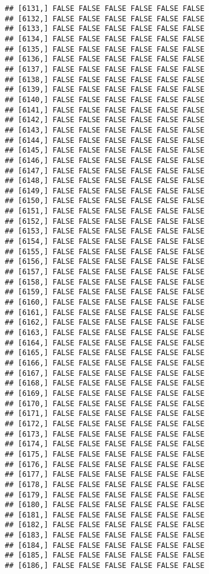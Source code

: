 \documentclass[
]{article}
\begin{document}
\begin{verbatim}
## [6131,] FALSE FALSE FALSE FALSE FALSE FALSE
## [6132,] FALSE FALSE FALSE FALSE FALSE FALSE
## [6133,] FALSE FALSE FALSE FALSE FALSE FALSE
## [6134,] FALSE FALSE FALSE FALSE FALSE FALSE
## [6135,] FALSE FALSE FALSE FALSE FALSE FALSE
## [6136,] FALSE FALSE FALSE FALSE FALSE FALSE
## [6137,] FALSE FALSE FALSE FALSE FALSE FALSE
## [6138,] FALSE FALSE FALSE FALSE FALSE FALSE
## [6139,] FALSE FALSE FALSE FALSE FALSE FALSE
## [6140,] FALSE FALSE FALSE FALSE FALSE FALSE
## [6141,] FALSE FALSE FALSE FALSE FALSE FALSE
## [6142,] FALSE FALSE FALSE FALSE FALSE FALSE
## [6143,] FALSE FALSE FALSE FALSE FALSE FALSE
## [6144,] FALSE FALSE FALSE FALSE FALSE FALSE
## [6145,] FALSE FALSE FALSE FALSE FALSE FALSE
## [6146,] FALSE FALSE FALSE FALSE FALSE FALSE
## [6147,] FALSE FALSE FALSE FALSE FALSE FALSE
## [6148,] FALSE FALSE FALSE FALSE FALSE FALSE
## [6149,] FALSE FALSE FALSE FALSE FALSE FALSE
## [6150,] FALSE FALSE FALSE FALSE FALSE FALSE
## [6151,] FALSE FALSE FALSE FALSE FALSE FALSE
## [6152,] FALSE FALSE FALSE FALSE FALSE FALSE
## [6153,] FALSE FALSE FALSE FALSE FALSE FALSE
## [6154,] FALSE FALSE FALSE FALSE FALSE FALSE
## [6155,] FALSE FALSE FALSE FALSE FALSE FALSE
## [6156,] FALSE FALSE FALSE FALSE FALSE FALSE
## [6157,] FALSE FALSE FALSE FALSE FALSE FALSE
## [6158,] FALSE FALSE FALSE FALSE FALSE FALSE
## [6159,] FALSE FALSE FALSE FALSE FALSE FALSE
## [6160,] FALSE FALSE FALSE FALSE FALSE FALSE
## [6161,] FALSE FALSE FALSE FALSE FALSE FALSE
## [6162,] FALSE FALSE FALSE FALSE FALSE FALSE
## [6163,] FALSE FALSE FALSE FALSE FALSE FALSE
## [6164,] FALSE FALSE FALSE FALSE FALSE FALSE
## [6165,] FALSE FALSE FALSE FALSE FALSE FALSE
## [6166,] FALSE FALSE FALSE FALSE FALSE FALSE
## [6167,] FALSE FALSE FALSE FALSE FALSE FALSE
## [6168,] FALSE FALSE FALSE FALSE FALSE FALSE
## [6169,] FALSE FALSE FALSE FALSE FALSE FALSE
## [6170,] FALSE FALSE FALSE FALSE FALSE FALSE
## [6171,] FALSE FALSE FALSE FALSE FALSE FALSE
## [6172,] FALSE FALSE FALSE FALSE FALSE FALSE
## [6173,] FALSE FALSE FALSE FALSE FALSE FALSE
## [6174,] FALSE FALSE FALSE FALSE FALSE FALSE
## [6175,] FALSE FALSE FALSE FALSE FALSE FALSE
## [6176,] FALSE FALSE FALSE FALSE FALSE FALSE
## [6177,] FALSE FALSE FALSE FALSE FALSE FALSE
## [6178,] FALSE FALSE FALSE FALSE FALSE FALSE
## [6179,] FALSE FALSE FALSE FALSE FALSE FALSE
## [6180,] FALSE FALSE FALSE FALSE FALSE FALSE
## [6181,] FALSE FALSE FALSE FALSE FALSE FALSE
## [6182,] FALSE FALSE FALSE FALSE FALSE FALSE
## [6183,] FALSE FALSE FALSE FALSE FALSE FALSE
## [6184,] FALSE FALSE FALSE FALSE FALSE FALSE
## [6185,] FALSE FALSE FALSE FALSE FALSE FALSE
## [6186,] FALSE FALSE FALSE FALSE FALSE FALSE

\end{verbatim}
\end{document}
